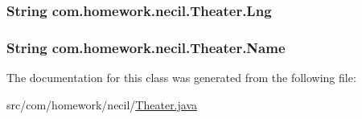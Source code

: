 \subsubsection[{\texorpdfstring{Lng}{Lng}}]{\setlength{\rightskip}{0pt plus 5cm}String com.\+homework.\+necil.\+Theater.\+Lng}\hypertarget{classcom_1_1homework_1_1necil_1_1_theater_a45d29c38e335f0fbb606b9556e418700}{}\label{classcom_1_1homework_1_1necil_1_1_theater_a45d29c38e335f0fbb606b9556e418700}
\subsubsection[{\texorpdfstring{Name}{Name}}]{\setlength{\rightskip}{0pt plus 5cm}String com.\+homework.\+necil.\+Theater.\+Name}\hypertarget{classcom_1_1homework_1_1necil_1_1_theater_aab1cd7ccbd3c65248fcde5846356e87c}{}\label{classcom_1_1homework_1_1necil_1_1_theater_aab1cd7ccbd3c65248fcde5846356e87c}


The documentation for this class was generated from the following file\+:\begin{DoxyCompactItemize}
\item 
src/com/homework/necil/\hyperlink{_theater_8java}{Theater.\+java}\end{DoxyCompactItemize}
